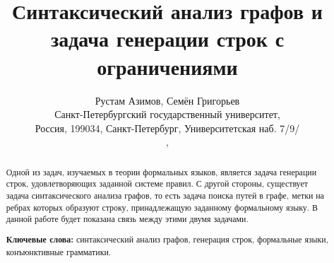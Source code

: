 \documentclass[10pt]{article}
\begin{document}
\title{Синтаксический анализ графов и задача генерации строк с ограничениями}
\author{Рустам Азимов, Семён Григорьев \\ 
Санкт-Петербургский государственный университет, \\
Россия, 199034, Санкт-Петербург, Университетская наб. 7/9/ \\ 
, 
}

\date{}
\maketitle

\begin{abstract}
Одной из задач, изучаемых в теории формальных языков, является задача генерации строк, удовлетворяющих заданной системе правил. С другой стороны, существует задача синтаксического анализа графов, то есть задача поиска путей в графе, метки на ребрах которых образуют строку, принадлежащую заданному формальному языку. В данной работе будет показана связь между этими двумя задачами.

\vspace{1em}
\textbf{Ключевые слова:} синтаксический анализ графов, генерация строк, формальные языки, конъюнктивные грамматики.

\end{abstract}







\setmonofont[Mapping=tex-text]{CMU Typewriter Text}


\end{document}
